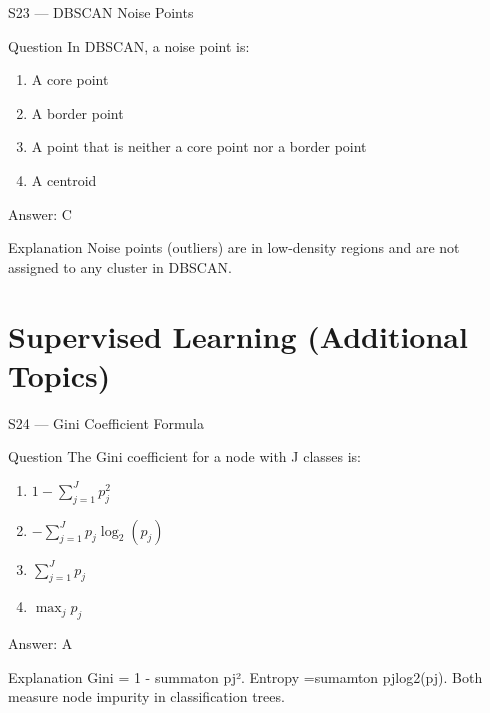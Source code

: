 \documentclass[aspectratio=169,8pt]{beamer}
\begin{document}
	\begin{frame}{S23 --- DBSCAN Noise Points}
		\begin{block}{Question}
			In DBSCAN, a noise point is:
			\begin{enumerate}
				\item A core point
				\item A border point
				\item A point that is neither a core point nor a border point
				\item A centroid
			\end{enumerate}
		\end{block}
		\begin{exampleblock}{Answer: C}\end{exampleblock}
		\begin{block}{Explanation}
			Noise points (outliers) are in low-density regions and are not assigned to any cluster in DBSCAN.
		\end{block}
	\end{frame}
	
	\section{Supervised Learning (Additional Topics)}
	
	\begin{frame}{S24 --- Gini Coefficient Formula}
		\begin{block}{Question}
			The Gini coefficient for a node with J classes is:
			\begin{enumerate}
				\item $1 - \sum_{j=1}^{J} p_j^2$
				\item $-\sum_{j=1}^{J} p_j \log_2(p_j)$
				\item $\sum_{j=1}^{J} p_j$
				\item $\max_j p_j$
			\end{enumerate}
		\end{block}
		\begin{exampleblock}{Answer: A}\end{exampleblock}
		\begin{block}{Explanation}
			Gini = 1 - summaton pj². Entropy =sumamton pjlog2(pj). Both measure node impurity in classification trees.
		\end{block}
	\end{frame}
	
\end{document}
